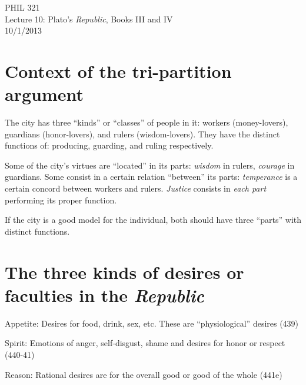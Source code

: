 \documentclass[11pt]{article}
\begin{document}
\thispagestyle{empty}
\begin{center} \LARGE{PHIL 321\\ Lecture 10: Plato's \emph{Republic}, Books III and IV}\\ \vspace*{2mm}
\large{10/1/2013}\end{center}
\thispagestyle{empty}\vspace*{3mm}
\vspace*{-8mm}

\section*{Context of the tri-partition argument}

\noindent The city has three ``kinds'' or ``classes'' of people in it: workers (money-lovers), guardians (honor-lovers), and rulers (wisdom-lovers). They have the distinct functions of: producing, guarding, and ruling respectively.
\vspace*{2mm}

\noindent Some of the city's virtues are ``located'' in its parts: \emph{wisdom} in rulers, \emph{courage} in guardians. Some consist in a certain relation ``between'' its parts: \emph{temperance} is a certain concord between workers and rulers. \emph{Justice} consists in \emph{each part }performing its proper function.
\vspace*{2mm}

\noindent If the city is a good model for the individual, both should have three ``parts'' with distinct functions.
\vspace*{-3mm}

\section*{The three kinds of desires or faculties in the \emph{Republic}}

\noindent Appetite: Desires for food, drink, sex, etc. These are ``physiological'' desires (439)
\vspace*{.5mm}

\noindent Spirit: Emotions of anger, self-disgust, shame and desires for honor or respect (440-41)
\vspace*{.5mm}

\noindent Reason: Rational desires are for the overall good or good of the whole (441e)
\vspace*{2mm}
\end{document}
